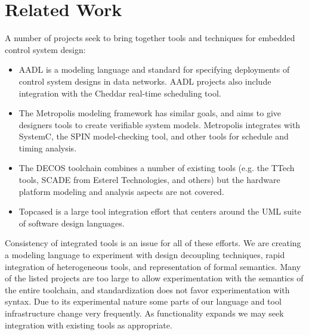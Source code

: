 \section{Related Work}

A number of projects seek to bring together tools and techniques for embedded control system design:

\begin{itemize}

\item AADL is a modeling language and standard for specifying deployments of control system 
designs in data networks\cite{modeling:aadl_control_systems}.  AADL projects also include 
integration with the Cheddar real-time scheduling tool\cite{sched:aadl_sched}.

\item The Metropolis modeling framework\cite{modeling:metropolis} has similar goals, and 
aims to give designers tools to create verifiable system models.  Metropolis integrates 
with SystemC, the SPIN model-checking tool, and other tools for schedule and timing analysis. 

\item The DECOS toolchain \cite{modeling:decos} combines a number of existing tools (e.g. the 
TTech tools, SCADE from Esterel Technologies, and others) but the hardware platform modeling 
and analysis aspects are not covered. 

\item Topcased\cite{modeling:Topcased} is a large tool integration effort that centers around 
the UML suite of software design languages.

\end{itemize}

Consistency of integrated tools is an issue for all of these efforts. We are creating a modeling 
language to experiment with design decoupling techniques, rapid integration of heterogeneous tools, 
and representation of formal semantics.  Many of the listed projects are too large to allow 
experimentation with the semantics of the entire toolchain, and standardization does not favor 
experimentation with syntax.  Due to its experimental nature some parts of our language and tool 
infrastructure change very frequently.  As functionality expands we may seek integration with 
existing tools as appropriate.
